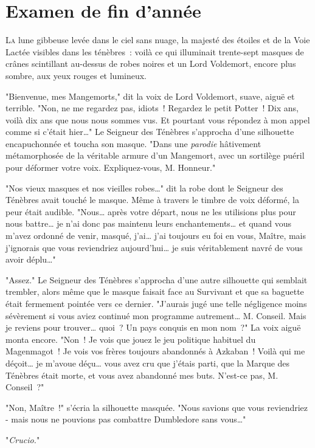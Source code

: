 \chapter{Examen de fin d’année}

\lettrine{L}{a} lune gibbeuse levée dans le ciel sans nuage, la majesté des étoiles et de la Voie Lactée visibles dans les ténèbres~: voilà ce qui illuminait trente-sept masques de crânes scintillant au-dessus de robes noires et un Lord Voldemort, encore plus sombre, aux yeux rouges et lumineux.

"Bienvenue, mes Mangemorts," dit la voix de Lord Voldemort, suave, aiguë et terrible. "Non, ne me regardez pas, idiots~! Regardez le petit Potter~! Dix ans, voilà dix ans que nous nous sommes vus. Et pourtant vous répondez à mon appel comme si c'était hier…" Le Seigneur des Ténèbres s'approcha d'une silhouette encapuchonnée et toucha son masque. "Dans une \emph{parodie} hâtivement métamorphosée de la véritable armure d'un Mangemort, avec un sortilège puéril pour déformer votre voix. Expliquez-vous, M. Honneur."

"Nos vieux masques et nos vieilles robes…" dit la robe dont le Seigneur des Ténèbres avait touché le masque. Même à travers le timbre de voix déformé, la peur était audible. "Nous… après votre départ, nous ne les utilisions plus pour nous battre… je n'ai donc pas maintenu leurs enchantements… et quand vous m'avez ordonné de venir, masqué, j'ai… j'ai toujours eu foi en vous, Maître, mais j'ignorais que vous reviendriez aujourd'hui… je suis véritablement navré de vous avoir déplu…"

"Assez." Le Seigneur des Ténèbres s'approcha d'une autre silhouette qui semblait trembler, alors même que le masque faisait face au Survivant et que sa baguette était fermement pointée vers ce dernier. "J'aurais jugé une telle négligence moins sévèrement si vous aviez continué mon programme autrement… M. Conseil. Mais je reviens pour trouver… quoi~? Un pays conquis en mon nom~?" La voix aiguë monta encore. "Non~! Je vois que jouez le jeu politique habituel du Magenmagot~! Je vois vos frères toujours abandonnés à Azkaban~! Voilà qui me déçoit… je m'avoue déçu… vous avez cru que j'étais parti, que la Marque des Ténèbres était morte, et vous avez abandonné mes buts. N'est-ce pas, M. Conseil~?"

"Non, Maître~!" s'écria la silhouette masquée. "Nous savions que vous reviendriez - mais nous ne pouvions pas combattre Dumbledore sans vous…"

"\emph{Crucio.}"

